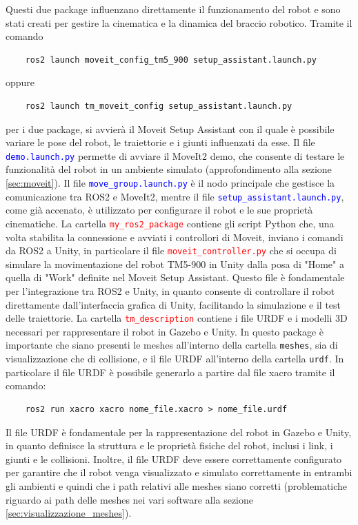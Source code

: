 \documentclass[11pt]{report}
\begin{document}
Questi due package influenzano direttamente il funzionamento del robot e sono stati creati per gestire la cinematica e la dinamica del braccio robotico. Tramite il comando 
\begin{verbatim}
    ros2 launch moveit_config_tm5_900 setup_assistant.launch.py
\end{verbatim}
oppure
\begin{verbatim}
    ros2 launch tm_moveit_config setup_assistant.launch.py
\end{verbatim} 
per i due package, si avvierà il Moveit Setup Assistant con il quale è possibile variare le pose del robot, le traiettorie e i giunti influenzati da esse. Il file \textcolor{blue}{\texttt{demo.launch.py}} permette di avviare il MoveIt2 demo, che consente di testare le funzionalità del robot in un ambiente simulato (approfondimento alla sezione \ref{sec:moveit}). Il file \textcolor{blue}{\texttt{move\_group.launch.py}} è il nodo principale che gestisce la comunicazione tra ROS2 e MoveIt2, mentre il file \textcolor{blue}{\texttt{setup\_assistant.launch.py}}, come già accenato, è utilizzato per configurare il robot e le sue proprietà cinematiche.
\newline
La cartella \textcolor{red}{\texttt{my\_ros2\_package}} contiene gli script Python che, una volta stabilita la connessione e avviati i controllori di Moveit, inviano i comandi da ROS2 a Unity, in particolare il file \textcolor{red}{\texttt{moveit\_controller.py}} che si occupa di simulare la movimentazione del robot TM5-900 in Unity dalla posa di "Home" a quella di "Work" definite nel Moveit Setup Assistant. Questo file è fondamentale per l'integrazione tra ROS2 e Unity, in quanto consente di controllare il robot direttamente dall'interfaccia grafica di Unity, facilitando la simulazione e il test delle traiettorie.
\newline
La cartella \textcolor{red}{\texttt{tm\_description}} contiene i file URDF e i modelli 3D necessari per rappresentare il robot in Gazebo e Unity. In questo package è importante che siano presenti le meshes all'interno della cartella \texttt{meshes}, sia di visualizzazione che di collisione, e il file URDF all'interno della cartella \texttt{urdf}.
In particolare il file URDF è possibile generarlo a partire dal file xacro tramite il comando:
\begin{verbatim}
    ros2 run xacro xacro nome_file.xacro > nome_file.urdf
\end{verbatim}
Il file URDF è fondamentale per la rappresentazione del robot in Gazebo e Unity, in quanto definisce la struttura e le proprietà fisiche del robot, inclusi i link, i giunti e le collisioni. Inoltre, il file URDF deve essere correttamente configurato per garantire che il robot venga visualizzato e simulato correttamente in entrambi gli ambienti e quindi che i path relativi alle meshes siano corretti (problematiche riguardo ai path delle meshes nei vari software alla sezione \ref{sec:visualizzazione_meshes}).
\end{document}
